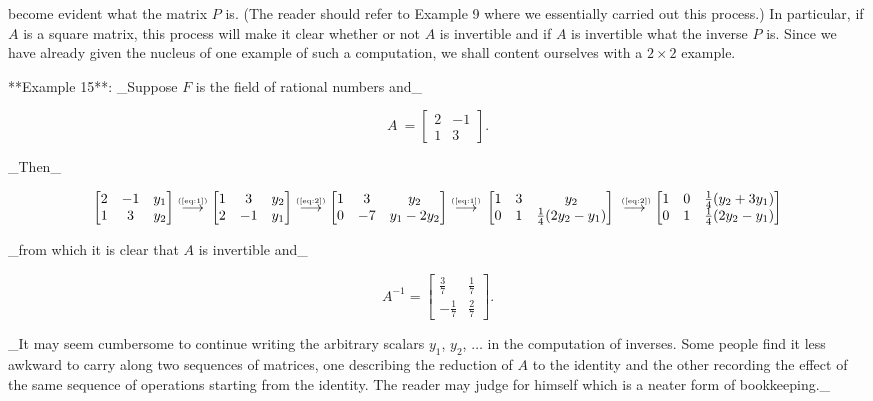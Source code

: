 become evident what the matrix \(P\) is. (The reader should refer to Example 9 where we essentially carried out this process.) In particular, if \(A\) is a square matrix, this process will make it clear whether or not \(A\) is invertible and if \(A\) is invertible what the inverse \(P\) is. Since we have already given the nucleus of one example of such a computation, we shall content ourselves with a \(2\times 2\) example.

**Example 15**: _Suppose \(F\) is the field of rational numbers and_

\[A\ =\begin{bmatrix}2&-1\\ 1&3\end{bmatrix}.\]

_Then_

\[\begin{bmatrix}2&-1&y_{1}\\ 1&3&y_{2}\end{bmatrix}\stackrel{{\text{\tiny(\ref{eq:1})}}}{{ \longrightarrow}}\begin{bmatrix}1&3&y_{2}\\ 2&-1&y_{1}\end{bmatrix}\stackrel{{\text{\tiny(\ref{eq:2})}}}{{ \longrightarrow}}\begin{bmatrix}1&3&y_{2}\\ 0&-7&y_{1}-2y_{2}\end{bmatrix}\stackrel{{\text{\tiny(\ref{eq:1})}}}{{ \longrightarrow}}\\ \\ \begin{bmatrix}1&3&y_{2}\\ 0&1&\frac{1}{4}(2y_{2}-y_{1})\end{bmatrix}\stackrel{{\text{ \tiny(\ref{eq:2})}}}{{\longrightarrow}}\begin{bmatrix}1&0&\frac{1}{4}(y_{2}+3y_ {1})\\ 0&1&\frac{1}{4}(2y_{2}-y_{1})\end{bmatrix}\]

_from which it is clear that \(A\) is invertible and_

\[A^{-1}=\begin{bmatrix}\frac{3}{7}&\frac{1}{7}\\ -\frac{1}{7}&\frac{2}{7}\end{bmatrix}.\]

_It may seem cumbersome to continue writing the arbitrary scalars \(y_{1}\), \(y_{2}\), \(\ldots\) in the computation of inverses. Some people find it less awkward to carry along two sequences of matrices, one describing the reduction of \(A\) to the identity and the other recording the effect of the same sequence of operations starting from the identity. The reader may judge for himself which is a neater form of bookkeeping._

